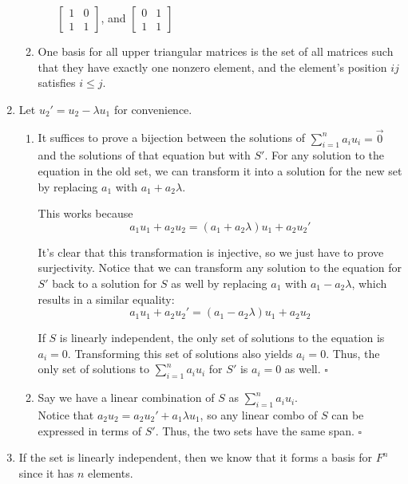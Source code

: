 \documentclass[12pt]{article}
\begin{document}
\begin{enumerate}
\begin{enumerate}
\begin{enumerate}
                                    $\begin{bmatrix}1 & 0 \\ 1 & 1\end{bmatrix}$, and
                                    $\begin{bmatrix}0 & 1 \\ 1 & 1\end{bmatrix}$
                        \end{enumerate}
                  \item One basis for all upper triangular matrices is the set of all matrices
                        such that they have exactly one nonzero element, and the element's position $ij$ satisfies $i \le j$.
            \end{enumerate}
      \item Let $u_2'=u_2-\lambda u_1$ for convenience.
            \begin{enumerate}
                  \item It suffices to prove a bijection between the solutions of
                        $\sum_{i=1}^n a_i u_i=\vec{0}$ and the solutions of that equation but with $S'$.
                        For any solution to the equation in the old set, we can transform it into a solution for the new
                        set by replacing $a_1$ with $a_1+a_2\lambda$.

                        This works because \[a_1u_1+a_2u_2=(a_1+a_2\lambda)u_1+a_2u_2'\]

                        It's clear that this transformation is injective, so we just have to prove surjectivity.
                        Notice that we can transform any solution to the equation for $S'$ back to a solution for $S$
                        as well by replacing $a_1$ with $a_1-a_2\lambda$, which results in a similar equality:
                        \[a_1u_1+a_2u_2'=(a_1-a_2\lambda)u_1+a_2u_2\]

                        If $S$ is linearly independent, the only set of solutions to the equation is $a_i=0$.
                        Transforming this set of solutions also yields $a_i=0$.
                        Thus, the only set of solutions to $\sum_{i=1}^n a_i u_i$ for $S'$ is $a_i=0$ as well. $\square$
                  \item Say we have a linear combination of $S$ as $\sum_{i=1}^n a_i u_i$. \\
                        Notice that $a_2u_2=a_2u_2'+a_1\lambda u_1$, so any linear combo of $S$ can be expressed in terms of $S'$.
                        Thus, the two sets have the same span. $\square$
            \end{enumerate}
      \item If the set is linearly independent, then we know that it forms a basis for $F^n$ since it has $n$ elements.


\end{enumerate}
\end{document}
